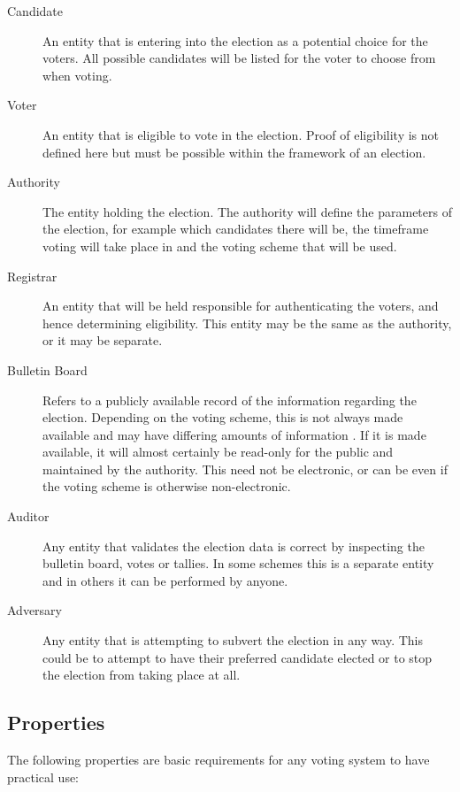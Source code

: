 \begin{description}
    \item[Candidate] An entity that is entering into the election as a potential choice for the voters. All possible candidates will be listed for the voter to choose from when voting.
    \item[Voter] An entity that is eligible to vote in the election. Proof of eligibility is not defined here but must be possible within the framework of an election.
    \item[Authority] The entity holding the election. The authority will define the parameters of the election, for example which candidates there will be, the timeframe voting will take place in and the voting scheme that will be used.
    \item[Registrar] An entity that will be held responsible for authenticating the voters, and hence determining eligibility. This entity may be the same as the authority, or it may be separate.
    \item[Bulletin Board] Refers to a publicly available record of the information regarding the election. Depending on the voting scheme, this is not always made available and may have differing amounts of information . If it is made available, it will almost certainly be read-only for the public and maintained by the authority. This need not be electronic, or can be even if the voting scheme is otherwise non-electronic.
    \item[Auditor] Any entity that validates the election data is correct by inspecting the bulletin board, votes or tallies. In some schemes this is a separate entity  and in others  it can be performed by anyone.
    \item[Adversary] Any entity that is attempting to subvert the election in any way. This could be to attempt to have their preferred candidate elected or to stop the election from taking place at all.
\end{description}

\subsection{Properties}
\label{ch:req:props}

The following properties are basic requirements for any voting system to have practical use:

